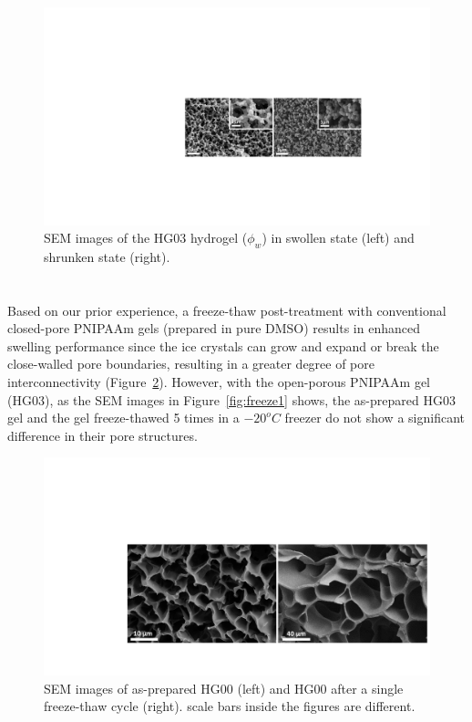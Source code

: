\begin{figure}[!th]
      \centering
      \includegraphics[width=\textwidth]{poreDeformation.pdf}
      \caption[]{SEM images of the HG03 hydrogel ($\phi_w$) in swollen state (left) and shrunken state (right).}
      \label{fig:poreDeformation}
\end{figure}

\section{}
Based on our prior experience, a freeze-thaw post-treatment with conventional closed-pore PNIPAAm gels (prepared in pure DMSO) results in enhanced swelling performance since the ice crystals can grow and expand or break the close-walled pore boundaries, resulting in a greater degree of pore interconnectivity (Figure~\ref{fig:freeze}). However, with the open-porous PNIPAAm gel (HG03), as the SEM images in Figure~\ref{fig:freeze1} shows, the as-prepared HG03 gel and the gel freeze-thawed 5 times in a $-20^{o}C$ freezer do not show a significant difference in their pore structures.

\begin{figure}[!th]
      \centering
      \includegraphics[width=\textwidth]{freeze.pdf}
      \caption[]{SEM images of as-prepared HG00 (left) and HG00 after a single freeze-thaw cycle (right). scale bars inside the figures are different.}
      \label{fig:freeze}
\end{figure}


